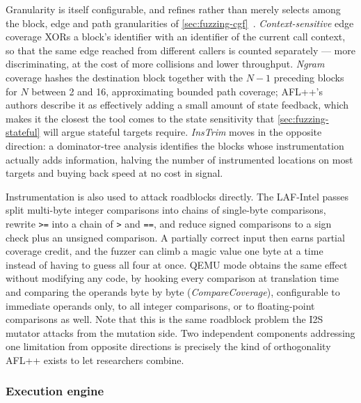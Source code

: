 Granularity is itself configurable, and refines rather than merely selects among the
block, edge and path granularities of \cref{sec:fuzzing-cgf}~\cite{fioraldi_afl_nodate}.
\emph{Context-sensitive} edge coverage XORs a block's identifier with an identifier of the
current call context, so that the same edge reached from different callers is counted
separately --- more discriminating, at the cost of more collisions and lower throughput.
\emph{Ngram} coverage hashes the destination block together with the $N-1$ preceding blocks
for $N$ between 2 and 16, approximating bounded path coverage; AFL++'s authors describe it
as effectively adding a small amount of state feedback, which makes it the closest the tool
comes to the state sensitivity that \cref{sec:fuzzing-stateful} will argue stateful targets
require.
\emph{InsTrim} moves in the opposite direction: a dominator-tree analysis identifies the
blocks whose instrumentation actually adds information, halving the number of instrumented
locations on most targets and buying back speed at no cost in
signal.

Instrumentation is also used to attack roadblocks directly.
The LAF-Intel passes split multi-byte integer comparisons into chains of single-byte
comparisons, rewrite \texttt{>=} into a chain of \texttt{>} and \texttt{==}, and reduce
signed comparisons to a sign check plus an unsigned comparison.
A partially correct input then earns partial coverage credit, and the fuzzer can climb a
magic value one byte at a time instead of having to guess all four at once.
QEMU mode obtains the same effect without modifying any code, by hooking every comparison
at translation time and comparing the operands byte by byte
(\emph{CompareCoverage}), configurable to immediate operands only, to all integer
comparisons, or to floating-point comparisons as well.
Note that this is the same roadblock problem the I2S mutator attacks from the mutation
side.
Two independent components addressing one limitation from opposite directions is precisely
the kind of orthogonality AFL++ exists to let researchers combine.

\subsubsection{Execution engine}

